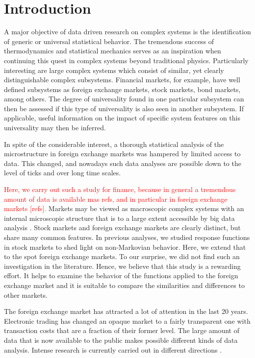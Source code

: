\section{Introduction}\label{sec:introduction}

A major objective of data driven research on complex systems is the
identification of generic or universal statistical behavior. The tremendous
success of thermodynamics and statistical mechanics serves as an inspiration
when continuing this quest in complex systems beyond traditional physics.
Particularly interesting are large complex systems which consist of similar,
yet clearly distinguishable complex subsystems. Financial markets, for example,
have well defined subsystems as foreign exchange markets, stock markets, bond
markets, among others. The degree of universality found in one particular
subsystem can then be assessed if this type of universality is also seen in
another subsystem. If applicable, useful information on the impact of specific
system features on this universality may then be inferred.

In spite of the considerable interest, a thorough statistical analysis of
the microstructure in foreign exchange markets was hampered by limited access
to data. This changed, and nowadays such data analyses are possible down to the
level of ticks and over long time scales.

\textcolor{red}{Here, we carry out such a study for finance, because in general a tremendous
amount of data is available \cite{physicists_contribution} mas refs, and in particular
in foreign exchange markets [refs].} Markets may be viewed as
macroscopic complex systems with an internal microscopic structure that is to a
large extent accessible by big data analysis \cite{complex_markets}.
Stock markets and foreign exchange markets are clearly distinct, but share many
common features. In previous analyses, we studied response functions in stock
markets to shed light on non-Markovian behavior. Here, we extend that to the
spot foreign exchange markets. To our surprise, we did not find such an
investigation in the literature. Hence, we believe that this study is a
rewarding effort. It helps to examine the behavior of the functions applied to
the foreign exchange market and it is suitable to compare the similarities and
differences to other markets.

The foreign exchange market has attracted a lot of attention in the last 20
years. Electronic trading has changed an opaque market to a fairly transparent
one with transaction costs that are a fraction of their former level. The large
amount of data that is now available to the public makes possible different
kinds of data analysis. Intense research is currently carried out in different
directions
\cite{forex_liquidity,info_forex,intraday_forex,forex_structure,teach_spread,forex_microstructure,electronic_forex,forex_algorithmic,curr_speculation,patterns_forex,eur_change_forex,spread_competition,political_forex,forex_volatility,local_forex,forex_inefficiency}.

